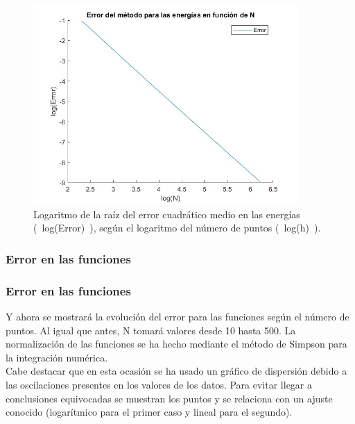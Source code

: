 \documentclass[12pt]{article}
\begin{document}
    \begin{figure}[H]
        \centering
        \includegraphics[width=0.9\textwidth]{fotos/logerror_ener_infinito_500.jpg}
        \caption{Logaritmo de la raíz del error cuadrático medio en las energías (~log(Error)~), según el logaritmo del número de puntos (~log(h)~).}
        \end{figure}

    \subsubsection{Error en las funciones}

        \subsubsection{Error en las funciones}

    Y ahora se mostrará la evolución del error para las funciones según el número de puntos. Al igual que antes, N tomará valores desde 10 hasta 500. La normalización de las funciones se ha hecho mediante el método de Simpson para la integración numérica.\\

    Cabe destacar que en esta ocasión se ha usado un gráfico de dispersión debido a las oscilaciones presentes en los valores de los datos. Para evitar llegar a conclusiones equivocadas se muestran los puntos y se relaciona con un ajuste conocido (logarítmico para el primer caso y lineal para el segundo).
    
\end{document}
